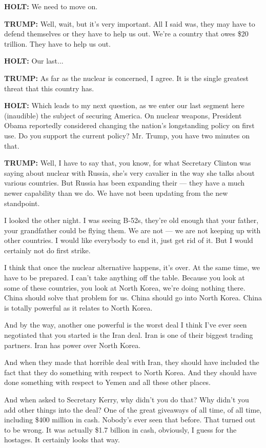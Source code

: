 \textbf{HOLT:} We need to move on.

\textbf{TRUMP:} Well, wait, but it's very important. All I said was,
they may have to defend themselves or they have to help us out. We're a
country that owes \$20 trillion. They have to help us out.

\textbf{HOLT:} Our last...

\textbf{TRUMP:} As far as the nuclear is concerned, I agree. It is the
single greatest threat that this country has.

\textbf{HOLT:} Which leads to my next question, as we enter our last
segment here (inaudible) the subject of securing America. On nuclear
weapons, President Obama reportedly considered changing the nation's
longstanding policy on first use. Do you support the current policy? Mr.
Trump, you have two minutes on that.

\textbf{TRUMP:} Well, I have to say that, you know, for what Secretary
Clinton was saying about nuclear with Russia, she's very cavalier in the
way she talks about various countries. But Russia has been expanding
their --- they have a much newer capability than we do. We have not been
updating from the new standpoint.

I looked the other night. I was seeing B-52s, they're old enough that
your father, your grandfather could be flying them. We are not --- we
are not keeping up with other countries. I would like everybody to end
it, just get rid of it. But I would certainly not do first strike.

I think that once the nuclear alternative happens, it's over. At the
same time, we have to be prepared. I can't take anything off the table.
Because you look at some of these countries, you look at North Korea,
we're doing nothing there. China should solve that problem for us. China
should go into North Korea. China is totally powerful as it relates to
North Korea.

And by the way, another one powerful is the worst deal I think I've ever
seen negotiated that you started is the Iran deal. Iran is one of their
biggest trading partners. Iran has power over North Korea.

And when they made that horrible deal with Iran, they should have
included the fact that they do something with respect to North Korea.
And they should have done something with respect to Yemen and all these
other places.

And when asked to Secretary Kerry, why didn't you do that? Why didn't
you add other things into the deal? One of the great giveaways of all
time, of all time, including \$400 million in cash. Nobody's ever seen
that before. That turned out to be wrong. It was actually \$1.7 billion
in cash, obviously, I guess for the hostages. It certainly looks that
way.

